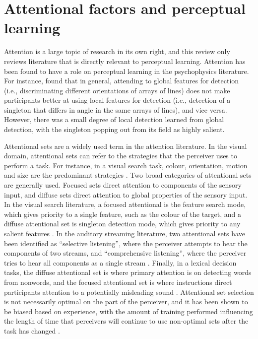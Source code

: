 \section{Attentional factors and perceptual learning}
\label{sec:attention}

Attention is a large topic of research in its own right, and this review only reviews literature that is directly relevant to perceptual learning.
Attention has been found to have a role on perceptual learning in the psychophysics literature.  
For instance, \citet{Ahissar1993} found that in general, attending to global features for detection (i.e., discriminating different orientations of arrays of lines) does not make participants better at using local features for detection (i.e., detection of a singleton that differs in angle in the same arrays of lines), and vice versa.  However, there was a small degree of local detection learned from global detection, with the singleton popping out from its field as highly salient.

Attentional sets are a widely used term in the attention literature.  
In the visual domain, attentional sets can refer to the strategies that the perceiver uses to perform a task.  
For instance, in a visual search task, colour, orientation, motion and size are the predominant strategies \citep{Wolfe2004}.  
Two broad categories of attentional sets are generally used.  
Focused sets direct attention to components of the sensory input, and diffuse sets direct attention to global properties of the sensory input.  
In the visual search literature, a focused attentional is the feature search mode, which gives priority to a single feature, such as the colour of the target, and a diffuse attentional set is singleton detection mode, which gives priority to any salient features \citep{Bacon1994}. 
In the auditory streaming literature, two attentional sets have been identified as ``selective listening'', where the perceiver attempts to hear the components of two streams, and ``comprehensive listening'', where the perceiver tries to hear all components as a single stream  \citep{vanNoorden1975}.
Finally, in a lexical decision tasks, the diffuse attentional set is where primary attention is on detecting words from nonwords, and the focused attentional set is where instructions direct participants attention to a potentially misleading sound \citep{Pitt2012}.
Attentional set selection is not necessarily optimal on the part of the perceiver, and it has been shown to be biased based on experience, with the amount of training performed influencing the length of time that perceivers will continue to use non-optimal sets after the task has changed \citep{Leber2006}.  

